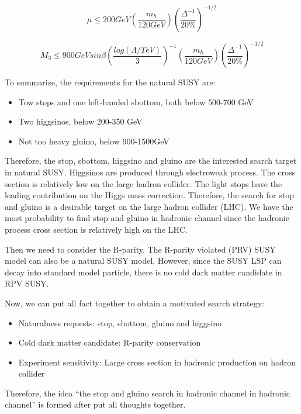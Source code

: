 \begin{equation}
 \mu \leq 200GeV (\frac{m_{h}}{120GeV})(\frac{\Delta^{-1}}{20\%})^{-1/2}
 \label{eq:c2nsusyhiggsinobound}
\end{equation}

\begin{equation}
 M_{3} \leq 900GeV sin\beta (\frac{log(\Lambda/TeV)}{3})^{-1}(\frac{m_{h}}{120GeV})(\frac{\Delta^{-1}}{20\%})^{-1/2}
 \label{eq:c2nsusygluinobound}
\end{equation}

To summarize, the requirements for the natural SUSY are:
\begin{itemize}
\item Tow stops and one left-handed sbottom, both below 500-700 GeV
\item Two higgsinos, below 200-350 GeV
\item Not too heavy gluino, below 900-1500GeV
\end{itemize}

Therefore, the stop, sbottom, higgsino and gluino are the interested search target in natural SUSY. Higgsinos are produced through electroweak process. The cross section is relatively low on the large hadron collider. The light stops have the leading contribution on the Higgs mass correction. Therefore, the search for stop and gluino is a desirable target on the large hadron collider (LHC). We have the most probability to find stop and gluino in hadronic channel since the hadronic process cross section is relatively high on the LHC. 

Then we need to consider the R-parity. The R-parity violated (PRV) SUSY model can also be a natural SUSY model. However, since the SUSY LSP can decay into standard model particle, there is no cold dark matter candidate in RPV SUSY. 

Now, we can put all fact together to obtain a motivated search strategy: 
\begin{itemize}
\item Naturalness requests: stop, sbottom, gluino and higgsino
\item Cold dark matter candidate: R-parity conservation
\item Experiment sensitivity: Large cross section in hadronic production on hadron collider
\end{itemize}

Therefore, the idea “the stop and gluino search in hadronic channel in hadronic channel” is formed after put all thoughts together.

